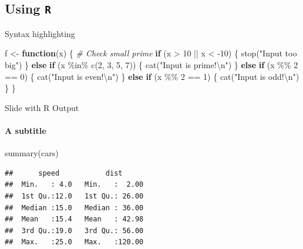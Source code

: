 \documentclass[,aspectratio=43]{beamer}
\newenvironment{Shaded}{\begin{snugshade}}{\end{snugshade}}
\newcommand{\CommentTok}[1]{\textcolor[rgb]{0.56,0.35,0.01}{\textit{#1}}}
\newcommand{\ControlFlowTok}[1]{\textcolor[rgb]{0.13,0.29,0.53}{\textbf{#1}}}
\newcommand{\DecValTok}[1]{\textcolor[rgb]{0.00,0.00,0.81}{#1}}
\newcommand{\FunctionTok}[1]{\textcolor[rgb]{0.00,0.00,0.00}{#1}}
\newcommand{\NormalTok}[1]{#1}
\newcommand{\OtherTok}[1]{\textcolor[rgb]{0.56,0.35,0.01}{#1}}
\newcommand{\SpecialCharTok}[1]{\textcolor[rgb]{0.00,0.00,0.00}{#1}}
\newcommand{\StringTok}[1]{\textcolor[rgb]{0.31,0.60,0.02}{#1}}
\begin{document}
\subsection{\texorpdfstring{Using \texttt{R}}{Using R}}\label{using-r}

\begin{frame}[fragile]{Syntax highlighting}
\label{syntax-highlighting}
\begin{Shaded}
\begin{Highlighting}[]
\NormalTok{f }\OtherTok{\textless{}{-}} \ControlFlowTok{function}\NormalTok{(x) \{}
  \CommentTok{\# Check small prime}
  \ControlFlowTok{if}\NormalTok{ (x }\SpecialCharTok{\textgreater{}} \DecValTok{10} \SpecialCharTok{||}\NormalTok{ x }\SpecialCharTok{\textless{}} \SpecialCharTok{{-}}\DecValTok{10}\NormalTok{) \{}
    \FunctionTok{stop}\NormalTok{(}\StringTok{"Input too big"}\NormalTok{)}
\NormalTok{  \} }\ControlFlowTok{else} \ControlFlowTok{if}\NormalTok{ (x }\SpecialCharTok{\%in\%} \FunctionTok{c}\NormalTok{(}\DecValTok{2}\NormalTok{, }\DecValTok{3}\NormalTok{, }\DecValTok{5}\NormalTok{, }\DecValTok{7}\NormalTok{)) \{}
    \FunctionTok{cat}\NormalTok{(}\StringTok{"Input is prime!}\SpecialCharTok{\textbackslash{}n}\StringTok{"}\NormalTok{)}
\NormalTok{  \} }\ControlFlowTok{else} \ControlFlowTok{if}\NormalTok{ (x }\SpecialCharTok{\%\%} \DecValTok{2} \SpecialCharTok{==} \DecValTok{0}\NormalTok{) \{}
    \FunctionTok{cat}\NormalTok{(}\StringTok{"Input is even!}\SpecialCharTok{\textbackslash{}n}\StringTok{"}\NormalTok{)}
\NormalTok{  \} }\ControlFlowTok{else} \ControlFlowTok{if}\NormalTok{ (x }\SpecialCharTok{\%\%} \DecValTok{2} \SpecialCharTok{==} \DecValTok{1}\NormalTok{) \{}
    \FunctionTok{cat}\NormalTok{(}\StringTok{"Input is odd!}\SpecialCharTok{\textbackslash{}n}\StringTok{"}\NormalTok{)}
\NormalTok{  \}}
\NormalTok{\}}
\end{Highlighting}
\end{Shaded}
\end{frame}

\begin{frame}[fragile]{Slide with R Output}
\label{slide-with-r-output}
\framesubtitle{A subtitle}

\begin{Shaded}
\begin{Highlighting}[]
\FunctionTok{summary}\NormalTok{(cars)}
\end{Highlighting}
\end{Shaded}

\begin{verbatim}
##      speed           dist       
##  Min.   : 4.0   Min.   :  2.00  
##  1st Qu.:12.0   1st Qu.: 26.00  
##  Median :15.0   Median : 36.00  
##  Mean   :15.4   Mean   : 42.98  
##  3rd Qu.:19.0   3rd Qu.: 56.00  
##  Max.   :25.0   Max.   :120.00
\end{verbatim}
\end{frame}
\end{document}

